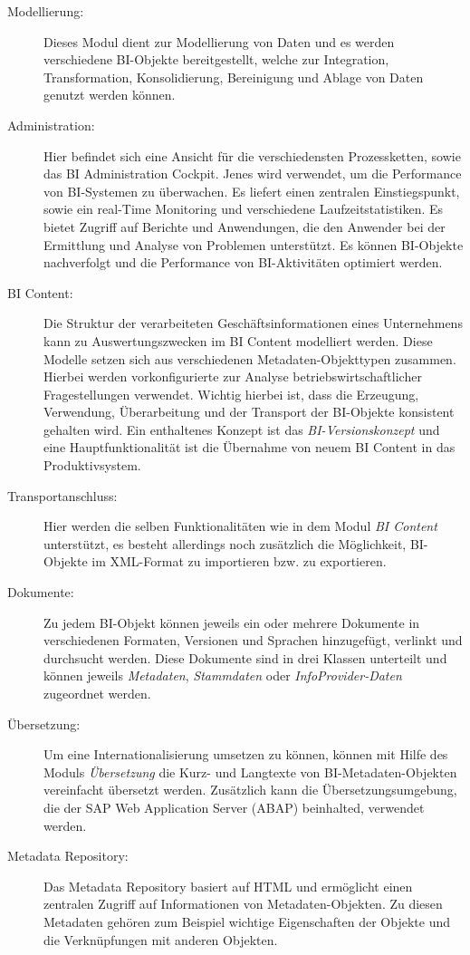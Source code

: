 \begin{description}
\item[Modellierung:] Dieses Modul dient zur Modellierung von Daten und es werden verschiedene BI-Objekte bereitgestellt, welche zur Integration, Transformation, Konsolidierung, Bereinigung und Ablage von Daten genutzt werden können.
\item[Administration:] Hier befindet sich eine Ansicht für die verschiedensten Prozessketten, sowie das BI Administration Cockpit. Jenes wird verwendet, um die Performance von BI-Systemen zu überwachen. Es liefert einen zentralen Einstiegspunkt, sowie ein real-Time Monitoring und verschiedene Laufzeitstatistiken. Es bietet Zugriff auf Berichte und Anwendungen, die den Anwender bei der Ermittlung und Analyse von Problemen unterstützt. Es können BI-Objekte nachverfolgt und die Performance von BI-Aktivitäten optimiert werden.
\item[BI Content:] Die Struktur der verarbeiteten Geschäftsinformationen eines Unternehmens kann zu Auswertungszwecken im BI Content modelliert werden. Diese Modelle setzen sich aus verschiedenen Metadaten-Objekttypen zusammen. Hierbei werden vorkonfigurierte zur Analyse betriebswirtschaftlicher Fragestellungen verwendet. Wichtig hierbei ist, dass die Erzeugung, Verwendung, Überarbeitung und der Transport der BI-Objekte konsistent gehalten wird. Ein enthaltenes Konzept ist das \textit{BI-Versionskonzept} und eine Hauptfunktionalität ist die Übernahme von neuem BI Content in das Produktivsystem.
\item[Transportanschluss:] Hier werden die selben Funktionalitäten wie in dem Modul \textit{BI Content} unterstützt, es besteht allerdings noch zusätzlich die Möglichkeit, BI-Objekte im XML-Format zu importieren bzw. zu exportieren.
\item[Dokumente:] Zu jedem BI-Objekt können jeweils ein oder mehrere Dokumente in verschiedenen Formaten, Versionen und Sprachen hinzugefügt, verlinkt und durchsucht werden. Diese Dokumente sind in drei Klassen unterteilt und können jeweils \textit{Metadaten}, \textit{Stammdaten} oder \textit{InfoProvider-Daten} zugeordnet werden.
\item[Übersetzung:] Um eine Internationalisierung umsetzen zu können, können mit Hilfe des Moduls \textit{Übersetzung} die Kurz- und Langtexte von BI-Metadaten-Objekten vereinfacht übersetzt werden. Zusätzlich kann die Übersetzungsumgebung, die der SAP Web Application Server (ABAP) beinhalted, verwendet werden. 
\item[Metadata Repository:] Das Metadata Repository basiert auf HTML und ermöglicht einen zentralen Zugriff auf Informationen von Metadaten-Objekten. Zu diesen Metadaten gehören zum Beispiel wichtige Eigenschaften der Objekte und die Verknüpfungen mit anderen Objekten.
\end{description}

